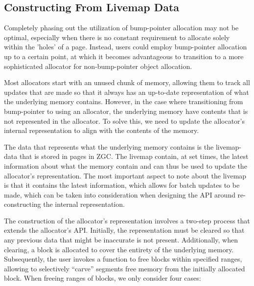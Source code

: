 

\subsection{Constructing From Livemap Data}

Completely phasing out the utilization of bump-pointer allocation may not be optimal, especially when there is no constant requirement to allocate solely within the 'holes' of a page. Instead, users could employ bump-pointer allocation up to a certain point, at which it becomes advantageous to transition to a more sophisticated allocator for non-bump-pointer object allocation.

Most allocators start with an unused chunk of memory, allowing them to track all updates that are made so that it always has an up-to-date representation of what the underlying memory contains. However, in the case where transitioning from bump-pointer to using an allocator, the underlying memory have contents that is not represented in the allocator. To solve this, we need to update the allocator's internal representation to align with the contents of the memory.

The data that represents what the underlying memory contains is the livemap-data that is stored in pages in ZGC. The livemap contain, at set times, the latest information about what the memory contain and can thus be used to update the allocator's representation. The most important aspect to note about the livemap is that it contains the latest information, which allows for batch updates to be made, which can be taken into consideration when designing the API around re-constructing the internal representation.

The construction of the allocator's representation involves a two-step process that extends the allocator's API. Initially, the representation must be cleared so that any previous data that might be inaccurate is not present. Additionally, when clearing, a block is allocated to cover the entirety of the underlying memory. Subsequently, the user invokes a function to free blocks within specified ranges, allowing to selectively ``carve'' segments free memory from the initially allocated block. When freeing ranges of blocks, we only consider four cases: 

